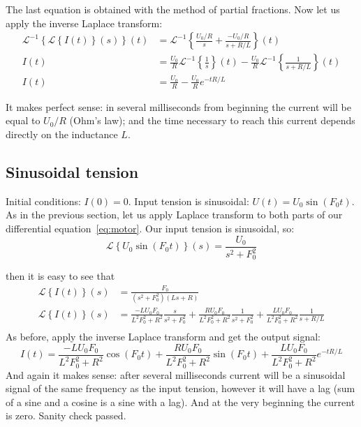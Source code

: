 \documentclass{article}
\newcommand{\Laplace}[1]{\mathcal{L}\left\{#1\right\}(s)}
\newcommand{\ILaplace}[1]{\mathcal{L}^{-1}\left\{#1\right\}(t)}
\begin{document}
The last equation is obtained with the method of partial fractions.
Now let us apply the inverse Laplace transform:
\begin{align*}
\ILaplace{\Laplace{I(t)}}  & = \ILaplace{\frac{U_0/R}{s} + \frac{-U_0/R}{s+R/L}} \\
I(t)  & = \frac{U_0}{R}\ILaplace{\frac{1}{s}} - \frac{U_0}{R}\ILaplace{\frac{1}{s+R/L}}\\
I(t) & = \frac{U_0}{R} - \frac{U_0}{R}e^{-t R/L}
\end{align*}

It makes perfect sense: in several milliseconds from beginning the current will be equal to $U_0/R$ (Ohm's law); and the time necessary to reach this current depends directly on the inductance $L$.

\subsection{Sinusoidal tension}
Initial conditions: $I(0) = 0$. Input tension is sinusoidal: $U(t) = U_0\sin(F_0 t)$.
As in the previous section, let us apply Laplace transform to both parts of our differential equation~\eqref{eq:motor}. 
Our input tension is sinusoidal, so:
$$
\Laplace{U_0\sin(F_0t)} = \frac{U_0}{s^2 + F_0^2}
$$

then it is easy to see that
\begin{align*}
    \Laplace{I(t)}  & = \frac{F_0}{(s^2 + F_0^2)(Ls+R)} \\
    \Laplace{I(t)}  & = \frac{-L U_0 F_0}{L^2 F_0^2 + R^2}\frac{s}{s^2 + F_0^2} +  \frac{R U_0 F_0}{L^2 F_0^2 + R^2}\frac{1}{s^2 + F_0^2} + \frac{L U_0 F_0}{L^2 F_0^2 + R^2}\frac{1}{s + R/L}  \\
\end{align*}
As before, apply the inverse Laplace transform and get the output signal:
$$
I(t) = \frac{-L U_0 F_0}{L^2 F_0^2 + R^2}\cos(F_0t) +  \frac{R U_0 F_0}{L^2 F_0^2 + R^2}\sin(F_0 t) + \frac{L U_0 F_0}{L^2 F_0^2 + R^2}e^{-tR/L} 
$$
And again it makes sense: after several milliseconds current will be a sinusoidal signal of the same frequency as the input tension, however it will have a lag (sum of a sine and a cosine is a sine with a lag). And at the very beginning the current is zero. Sanity check passed.

\end{document}
